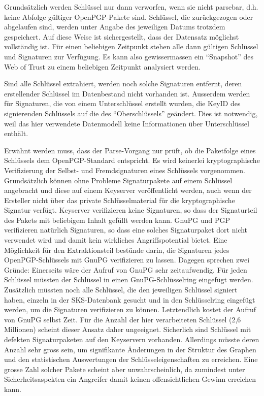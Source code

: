 Grundsätzlich werden Schlüssel nur dann verworfen, wenn sie nicht
parsebar, d.h. keine Abfolge gültiger OpenPGP-Pakete sind. Schlüssel,
die zurückgezogen oder abgelaufen sind, werden unter Angabe des
jeweiligen Datums trotzdem gespeichert. Auf diese Weise ist
sichergestellt, dass der Datensatz möglichst vollständig ist. Für
einen beliebigen Zeitpunkt stehen alle dann gültigen Schlüssel und
Signaturen zur Verfügung. Es kann also gewissermassen ein
"`Snapshot"' des Web of Trust zu einem beliebigen Zeitpunkt
analysiert werden.

Sind alle Schlüssel extrahiert, werden noch solche Signaturen
entfernt, deren erstellender Schlüssel im Datenbestand nicht vorhanden
ist. Ausserdem werden für Signaturen, die von einem Unterschlüssel
erstellt wurden, die KeyID des signierenden Schlüssels auf die des
"`Oberschlüssels"' geändert. Dies ist notwendig, weil das hier
verwendete Datenmodell keine Informationen über Unterschlüssel
enthält.

Erwähnt werden muss, dass der Parse-Vorgang nur prüft, ob die
Paketfolge eines Schlüssels dem OpenPGP-Standard entspricht. Es wird
keinerlei kryptographische Verifizierung der Selbst- und
Fremdsignaturen eines Schlüssels vorgenommen. Grundsätzlich können
ohne Probleme Signaturpakete auf einem Schlüssel angebracht und diese
auf einem Keyserver veröffentlicht werden, auch wenn der Ersteller
nicht über das private Schlüsselmaterial für die kryptographische
Signatur verfügt. Keyserver verifizieren keine Signaturen, so dass der
Signaturteil des Pakets mit beliebigem Inhalt gefüllt werden
kann. GnuPG und PGP verifizieren natürlich Signaturen, so dass eine
solches Signaturpaket dort nicht verwendet wird und damit kein
wirkliches Angriffspotential bietet. Eine Möglichkeit für den
Extraktionsteil bestünde darin, die Signaturen jedes
OpenPGP-Schlüssels mit GnuPG verifizieren zu lassen. Dagegen sprechen
zwei Gründe: Einerseits wäre der Aufruf von GnuPG sehr
zeitaufwendig. Für jeden Schlüssel müssten der Schlüssel in einen
GnuPG-Schlüsselring eingefügt werden. Zusätzlich müssten noch alle
Schlüssel, die den jeweiligen Schlüssel signiert haben, einzeln in der
SKS-Datenbank gesucht und in den Schlüsselring eingefügt werden, um
die Signaturen verifizieren zu können. Letztendlich kostet der Aufruf
von GnuPG selbst Zeit. Für die Anzahl der hier verarbeiteten Schlüssel
(2,6 Millionen) scheint dieser Ansatz daher ungeeignet. Sicherlich
sind Schlüssel mit defekten Signaturpaketen auf den Keyservern
vorhanden. Allerdings müsste deren Anzahl sehr gross sein, um
signifikante Änderungen in der Struktur des Graphen und den
statistischen Auswertungen der Schlüsseleigenschaften zu
erreichen. Eine grosse Zahl solcher Pakete scheint aber
unwahrscheinlich, da zumindest unter Sicherheitsaspekten ein Angreifer
damit keinen offensichtlichen Gewinn erreichen kann.

